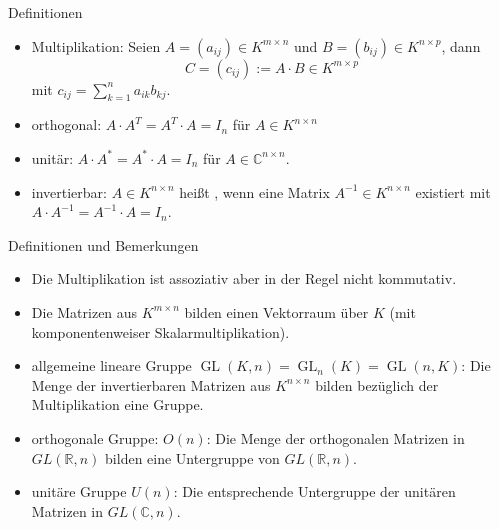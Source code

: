 \documentclass[notes=hide,hyperref={dvipdfmx,pdfpagelabels=false}]{beamer}
\begin{document}
\begin{frame}{Definitionen}
\begin{itemize}
\item {\color{red} Multiplikation}: Seien $A=(a_{ij}) \in {K}^{m \times n}$ und $B=(b_{ij})
\in {K}^{n \times p}$, dann 
\[ C=(c_{ij}):=A \cdot B \in{K}^{m \times p} \]
mit $c_{ij}=\sum_{k=1}^n a_{ik} b_{kj}$. 
\item {\color{red} orthogonal}: $A \cdot A^T=A^T \cdot A=I_n$ für $A\in K^{n \times n}$ 
\item {\color{red} unitär}: $A \cdot A^*=A^* \cdot A=I_n$ für $A\in \mathbb{C}^{n \times n}$.
\item {\color{red} invertierbar}: $A\in K^{n \times n}$ heißt , wenn eine
Matrix $A^{-1}\in K^{n \times n}$ existiert mit  $A \cdot
A^{-1}=A^{-1} \cdot A=I_n$.
\end{itemize}
\end{frame} 

\begin{frame}{Definitionen und Bemerkungen}
\begin{itemize}
\item Die Multiplikation ist assoziativ aber in der Regel \alert{nicht kommutativ}. 
\item Die Matrizen aus $K^{m \times n}$ bilden einen Vektorraum über
$K$ (mit komponentenweiser Skalarmultiplikation).
\item {\color{red} allgemeine
lineare Gruppe} $\operatorname{GL}(K,n) = \operatorname{GL}_n(K) = \operatorname{GL}(n,K)$: 
Die Menge der invertierbaren Matrizen aus $K^{n \times n}$ bilden bezüglich der Multiplikation eine Gruppe.
\item {\color{red} orthogonale Gruppe}: $O(n)$: Die Menge der orthogonalen Matrizen in $GL(\mathbb{R},n)$ bilden
 eine Untergruppe von  $GL(\mathbb{R},n)$. 
\item  {\color{red} unitäre Gruppe} $U(n)$: Die entsprechende Untergruppe der unitären Matrizen in $GL(\mathbb{C},n)$.
\end{itemize}
\end{frame}
\end{document}
